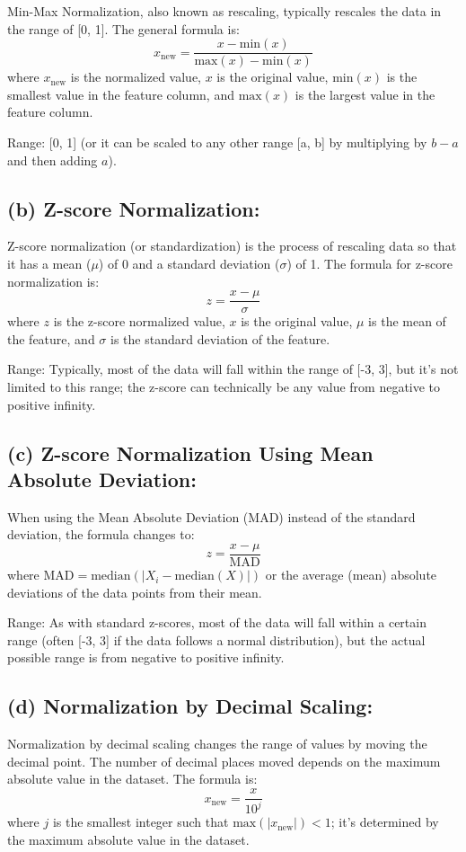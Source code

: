 \documentclass{article}
\begin{document}
Min-Max Normalization, also known as rescaling, typically rescales the data in the range of [0, 1]. The general formula is:
\[
x_{\text{new}} = \frac{x - \text{min}(x)}{\text{max}(x) - \text{min}(x)}
\]
where $x_{\text{new}}$ is the normalized value, $x$ is the original value, $\text{min}(x)$ is the smallest value in the feature column, and $\text{max}(x)$ is the largest value in the feature column.

Range: [0, 1] (or it can be scaled to any other range [a, b] by multiplying by $b-a$ and then adding $a$).

\subsection*{(b) Z-score Normalization:}

Z-score normalization (or standardization) is the process of rescaling data so that it has a mean ($\mu$) of 0 and a standard deviation ($\sigma$) of 1. The formula for z-score normalization is:
\[
z = \frac{x - \mu}{\sigma}
\]
where $z$ is the z-score normalized value, $x$ is the original value, $\mu$ is the mean of the feature, and $\sigma$ is the standard deviation of the feature.

Range: Typically, most of the data will fall within the range of [-3, 3], but it's not limited to this range; the z-score can technically be any value from negative to positive infinity.

\subsection*{(c) Z-score Normalization Using Mean Absolute Deviation:}

When using the Mean Absolute Deviation (MAD) instead of the standard deviation, the formula changes to:
\[
z = \frac{x - \mu}{\text{MAD}}
\]
where $\text{MAD} = \text{median}(|X_i - \text{median}(X)|)$ or the average (mean) absolute deviations of the data points from their mean.

Range: As with standard z-scores, most of the data will fall within a certain range (often [-3, 3] if the data follows a normal distribution), but the actual possible range is from negative to positive infinity.

\subsection*{(d) Normalization by Decimal Scaling:}

Normalization by decimal scaling changes the range of values by moving the decimal point. The number of decimal places moved depends on the maximum absolute value in the dataset. The formula is:
\[
x_{\text{new}} = \frac{x}{10^j}
\]
where $j$ is the smallest integer such that $\text{max}(|x_{\text{new}}|) < 1$; it's determined by the maximum absolute value in the dataset.
\end{document}

